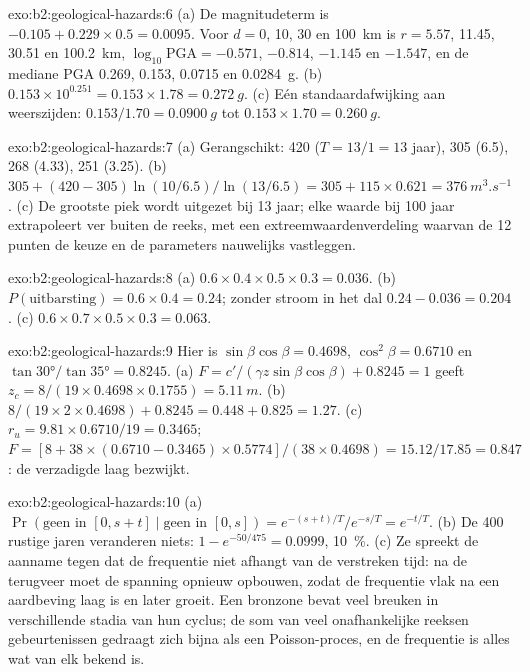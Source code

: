\begin{solution}{exo:b2:geological-hazards:6}
(a) De magnitudeterm is $-0.105 + 0.229 \times 0.5 = 0.0095$. Voor $d = 0$, 10, 30 en
\qty{100}{km} is $r = 5.57$, 11.45, 30.51 en \qty{100.2}{km}, $\log_{10}\mathrm{PGA} = -0.571$,
$-0.814$, $-1.145$ en $-1.547$, en de mediane PGA 0.269, 0.153, 0.0715 en \qty{0.0284}{g}.
(b) $0.153 \times 10^{0.251} = 0.153 \times 1.78 = \qty{0.272}{g}$. (c) Eén standaardafwijking
aan weerszijden: $0.153/1.70 = \qty{0.0900}{g}$ tot $0.153 \times 1.70 = \qty{0.260}{g}$.
\end{solution}

\begin{solution}{exo:b2:geological-hazards:7}
(a) Gerangschikt: 420 ($T = 13/1 = 13$ jaar), 305 (6.5), 268 (4.33), 251 (3.25). (b) $305 + (420 -
305)\ln(10/6.5)/\ln(13/6.5) = 305 + 115 \times 0.621 = \qty{376}{m^3.s^{-1}}$. (c) De grootste piek
wordt uitgezet bij 13 jaar; elke waarde bij 100 jaar extrapoleert ver buiten de reeks, met een
extreemwaardenverdeling waarvan de 12 punten de keuze en de parameters nauwelijks vastleggen.
\end{solution}

\begin{solution}{exo:b2:geological-hazards:8}
(a) $0.6 \times 0.4 \times 0.5 \times 0.3 = 0.036$. (b) $P(\text{uitbarsting}) = 0.6 \times 0.4 = 0.24$;
zonder stroom in het dal $0.24 - 0.036 = 0.204$. (c) $0.6 \times 0.7 \times 0.5 \times 0.3 =
0.063$.
\end{solution}

\begin{solution}{exo:b2:geological-hazards:9}
Hier is $\sin\beta\cos\beta = 0.4698$, $\cos^2\beta = 0.6710$ en $\tan\ang{30}/\tan\ang{35} =
0.8245$. (a) $F = c'/(\gamma z\sin\beta\cos\beta) + 0.8245 = 1$ geeft $z_c = 8/(19 \times 0.4698
\times 0.1755) = \qty{5.11}{m}$. (b) $8/(19 \times 2 \times 0.4698) + 0.8245 = 0.448 + 0.825 =
1.27$. (c) $r_u = 9.81 \times 0.6710/19 = 0.3465$; $F = [8 + 38 \times (0.6710 - 0.3465) \times
0.5774]/(38 \times 0.4698) = 15.12/17.85 = 0.847$: de verzadigde laag bezwijkt.
\end{solution}

\begin{solution}{exo:b2:geological-hazards:10}
(a) $\Pr(\text{geen in } [0, s+t] \mid \text{geen in } [0, s]) = e^{-(s+t)/T}/e^{-s/T} = e^{-t/T}$.
(b) De 400 rustige jaren veranderen niets: $1 - e^{-50/475} = 0.0999$, \qty{10}{\percent}. (c) Ze
spreekt de aanname tegen dat de frequentie niet afhangt van de verstreken tijd: na de terugveer moet de
spanning opnieuw opbouwen, zodat de frequentie vlak na een aardbeving laag is en later groeit. Een
bronzone bevat veel breuken in verschillende stadia van hun cyclus; de som van veel onafhankelijke reeksen
gebeurtenissen gedraagt zich bijna als een Poisson-proces, en de frequentie is alles wat van elk bekend is.
\end{solution}

